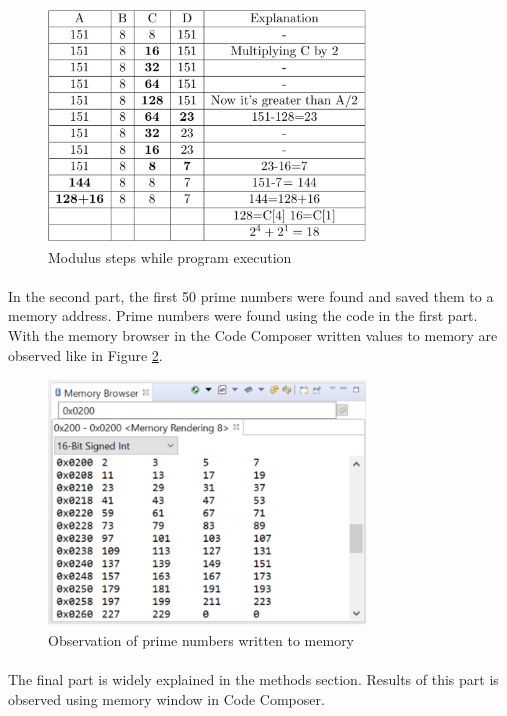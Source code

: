 \documentclass[pdftex,12pt,a4paper]{article}
\begin{document}
\begin{figure}[H]
    \centering
    \includegraphics[width=0.75\textwidth]{modulus.png}
    \caption{Modulus steps while program execution}
    \label{fig:modulus}
\end{figure}

\paragraph{}
In the second part, the first 50 prime numbers were found and saved them to a memory address. Prime numbers were found using the code in the first part. With the memory browser in the Code Composer written values to memory are observed like in Figure \ref{fig:memory}.

\begin{figure}[H]
    \centering
    \includegraphics[width=0.75\textwidth]{memory.png}
    \caption{Observation of prime numbers written to memory}
    \label{fig:memory}
\end{figure}

\paragraph{}
The final part is widely explained in the methods section. Results of this part is observed using memory window in Code Composer. 
\end{document}
